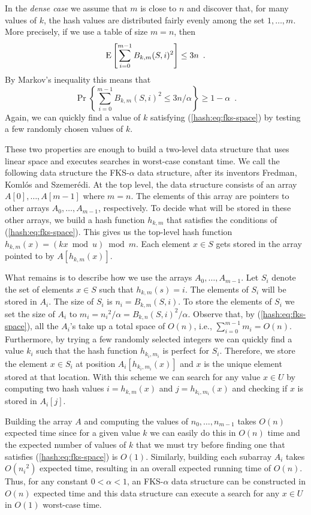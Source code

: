 In the \emph{dense case} we assume that $m$ is close to $n$ and
discover that, for many values of $k$, the hash values are distributed
fairly evenly among the set $1,\ldots,m$.  More precisely, if we use a
table of size $m=n$, then 
\[
   \E \left[ \sum_{i=0}^{m-1} B_{k,m}(S,i)^2 \right] \le 3n \enspace .
      \label{hash:eq:fks-space-a}
\]
By Markov's inequality this means that
\begin{equation}
   \Pr\left\{ \sum_{i=0}^{m-1} B_{k,m}(S,i)^2  \le 3n/\alpha \right\}
\ge
	1-\alpha \enspace .
      \label{hash:eq:fks-space}
\end{equation}
Again, we can quickly find a value of $k$ satisfying
(\ref{hash:eq:fks-space}) by testing a few randomly chosen values of
$k$.

These two properties are enough to build a two-level data structure
that uses linear space and executes searches in worst-case constant
time.  We call the following data structure the FKS-$\alpha$ data
structure, after its inventors Fredman, Koml\'os and Szemer\'edi.  At
the top level, the data structure consists of an array
$A[0],\ldots,A[m-1]$ where $m=n$.  The elements of this array are
pointers to other arrays $A_0,\ldots,A_{m-1}$, respectively.  To
decide what will be stored in these other arrays, we build a hash
function $h_{k,m}$ that satisfies the conditions of
(\ref{hash:eq:fks-space}).  This gives us the top-level hash function
$h_{k,m}(x)=(kx\bmod u)\bmod m$. Each element $x\in S$ gets stored in
the array pointed to by $A[h_{k,m}(x)]$.

What remains is to describe how we use the arrays
$A_0,\ldots,A_{m-1}$.  Let $S_i$ denote the set of elements $x\in S$
such that $h_{k,m}(s)=i$.  The elements of $S_i$ will be stored in
$A_i$.  The size of $S_i$ is $n_i=B_{k,m}(S,i)$.  To store the
elements of $S_i$ we set the size of $A_i$ to
$m_i=n_i{}^2/\alpha=B_{k,n}(S,i)^2/\alpha$.  Observe that, by
(\ref{hash:eq:fks-space}), all the $A_i$'s take up a total space of
$O(n)$, i.e., $\sum_{i=0}^{m-1} m_i = O(n)$.  Furthermore, by trying a
few randomly selected integers we can quickly find a value $k_i$ such
that the hash function $h_{k_i,m_i}$ is perfect for $S_i$.  Therefore,
we store the element $x\in S_i$ at position $A_i[h_{k_i,m_i}(x)]$ and
$x$ is the unique element stored at that location.  With this scheme
we can search for any value $x\in U$ by computing two hash values
$i=h_{k,m}(x)$ and $j=h_{k_i,m_i}(x)$ and checking if $x$ is stored in
$A_i[j]$.

Building the array $A$ and computing the values of
$n_0,\ldots,n_{m-1}$ takes $O(n)$ expected time since for a given
value $k$ we can easily do this in $O(n)$ time and the expected number
of values of $k$ that we must try before finding one that satisfies
(\ref{hash:eq:fks-space}) is $O(1)$.  Similarly, building each subarray
$A_i$ takes $O(n_i{}^2)$ expected time, resulting in an overall expected
running time of $O(n)$.  Thus, for any constant $0<\alpha<1$, an
FKS-$\alpha$ data structure can be constructed in $O(n)$ expected time
and this data structure can execute a search for any $x\in U$ in
$O(1)$ worst-case time.

